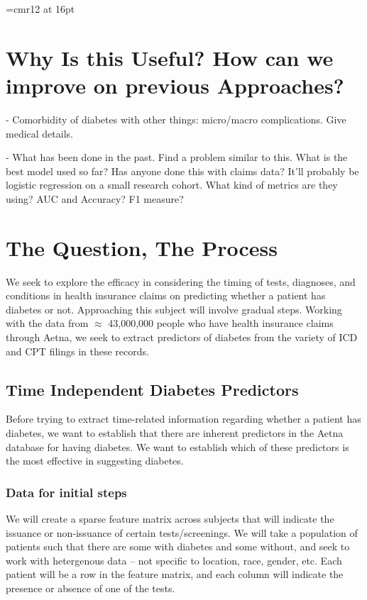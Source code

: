 \documentclass{article}
\begin{document}
\font\myfont=cmr12 at 16pt
\maketitle


\section{Why Is this Useful? How can we improve on previous Approaches?}

- Comorbidity of diabetes with other things: micro/macro complications. Give medical details.

- What has been done in the past. Find a problem similar to this. What is the best model used so far? Has anyone done this with claims data? It'll probably be logistic regression on a small research cohort. What kind of metrics are they using? AUC and Accuracy? F1 measure?

\section{The Question, The Process}
\doublespacing

We seek to explore the efficacy in considering the timing of tests, diagnoses, and conditions in health insurance claims on predicting whether a patient has diabetes or not. Approaching this subject will involve gradual steps. Working with the data from $\approx$ 43,000,000 people who have health insurance claims through Aetna, we seek to extract predictors of diabetes from the variety of ICD and CPT filings in these records. 
 

\subsection{Time Independent Diabetes Predictors}

Before trying to extract time-related information regarding whether a patient has diabetes, we want to establish that there are inherent predictors in the Aetna database for having diabetes. We want to establish which of these predictors is the most effective in suggesting diabetes. 

\subsubsection{Data for initial steps}

We will create a sparse feature matrix across subjects that will indicate the issuance or non-issuance of certain tests/screenings. We will take a population of patients such that there are some with diabetes and some without, and seek to work with hetergenous data -- not specific to location, race, gender, etc. Each patient will be a row in the feature matrix, and each column will indicate the presence or absence of one of the tests. 
\end{document}
